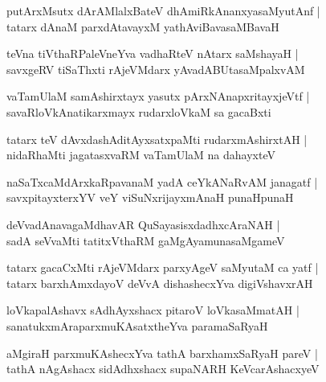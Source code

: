 \documentclass[twoside,12pt,openright]{book}
\newcounter{shloka}[chapter]
\begin{document}
\begin{shloka}
putArxMsutx dArAMlalxBateV dhAmiRkAnanxyasaMyutAnf |\\
tatarx dAnaM parxdAtavayxM yathAviBavasaMBavaH 
\end{shloka}

\begin{shloka}
teVna tiVthaRPaleVneYva vadhaRteV nAtarx saMshayaH |\\
savxgeRV tiSaThxti rAjeVMdarx yAvadABUtasaMpalxvAM 
\end{shloka}

\begin{shloka}
vaTamUlaM samAshirxtayx yasutx pArxNAnapxritayxjeVtf |\\
savaRloVkAnatikarxmayx rudarxloVkaM sa gacaBxti 
\end{shloka}

\begin{shloka}
tatarx teV dAvxdashAditAyxsatxpaMti rudarxmAshirxtAH |\\
nidaRhaMti jagatasxvaRM vaTamUlaM na dahayxteV
\end{shloka}

\begin{shloka}
naSaTxcaMdArxkaRpavanaM yadA ceYkANaRvAM janagatf |\\
savxpitayxterxYV veY viSuNxrijayxmAnaH punaHpunaH 
\end{shloka}

\begin{shloka}
deVvadAnavagaMdhavAR QuSayasisxdadhxcAraNAH |\\
sadA seVvaMti tatitxVthaRM gaMgAyamunasaMgameV 
\end{shloka}

\begin{shloka}
tatarx gacaCxMti rAjeVMdarx parxyAgeV saMyutaM ca yatf |\\
tatarx barxhAmxdayoV deVvA dishashecxYva digiVshavxrAH 
\end{shloka}

\begin{shloka}
loVkapalAshavx sAdhAyxshacx pitaroV loVkasaMmatAH |\\
sanatukxmAraparxmuKAsatxtheYva paramaSaRyaH 
\end{shloka}

\begin{shloka}
aMgiraH parxmuKAshecxYva tathA barxhamxSaRyaH pareV |\\
tathA nAgAshacx sidAdhxshacx supaNARH KeVcarAshacxyeV 
\end{shloka}
\end{document}
